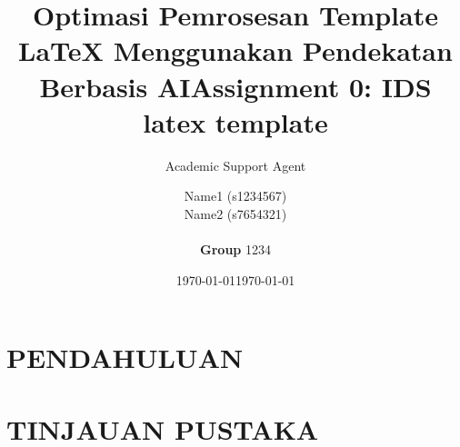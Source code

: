 \documentclass{article}
\title{Optimasi Pemrosesan Template LaTeX Menggunakan Pendekatan Berbasis AI}
\author{Academic Support Agent}
\date{\today}
\begin{document}
\maketitle

\begin{abstract}

\end{abstract}

\chapter{PENDAHULUAN}


\chapter{TINJAUAN PUSTAKA}


\usepackage[a4paper,top=2cm,bottom=2.5cm,left=1.5cm,right=1.5cm,marginparwidth=1.75cm]{geometry}
\usepackage[english]{babel}
\usepackage[utf8x]{inputenc}
\usepackage{listings}


\usepackage{float}
\usepackage{amsmath}
\usepackage[colorinlistoftodos]{todonotes}
\usepackage[colorlinks=true, allcolors=blue]{hyperref}
\usepackage{listings}
\usepackage{url}
\usepackage{graphicx}
\graphicspath{ {./images/} }


\title{Assignment 0: IDS latex template}
\author{
Name1 (s1234567) \\ 
Name2 (s7654321) \\ 
 \\ \textbf{Group} 1234}
\date{\today}
\end{document}
